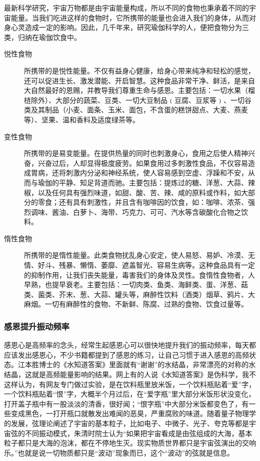 最新科学研究，宇宙万物都是由宇宙能量构成，所以不同的食物也秉承着不同的宇宙能量。当我们吃进这样的食物时，它所携带的能量也会进入我们的身体，从而对身心灵造成一定的影响。因此，几千年来，研究瑜伽科学的人，便把食物分为三类，归纳在瑜伽饮食中。

\begin{description}
    \item[悦性食物] 所携带的是悦性能量。不仅有益身心健康，给身心带来纯净和轻松的感觉，还可以促进生长、激发潜能、开启智慧。这种食品非常干净、鲜活，是来自大自然最好的恩赐，并教导我们尊重生命与感恩。主要包括：一切水果（榴梿除外）、大部分的蔬菜、豆类、一切大豆制品﹙豆腐、豆浆等﹚、一切谷类及其制品（小麦、面条、玉米、面包，不含蛋的糕饼甜点、大麦、燕麦等）、坚果、温和香料及适度绿茶等。
    \item[变性食物] 所携带的是易变能量。在提供热量的同时也刺激身心，食用之后使人精神兴奋，兴奋过后，人却显得极度疲劳。如果食用过多刺激性食品，不仅容易造成胃病，还将刺激内分泌和神经系统，使人容易感到空虚、浮躁和不安，从而与瑜伽的平静、知足背道而驰。主要包括：提炼过的糖、洋葱、大蒜、辣椒，以及任何具有强烈味道，如甜、酸、苦、辣、咸的原料或作料，如大部分的零食；还有具有刺激性，并且含有咖啡因的饮食，如：咖啡、浓茶、强烈调味、酱油、白萝卜、海带、巧克力、可可、汽水等含碳酸化合物之饮料。
    \item[惰性食物] 所携带的是惰性能量。此类食物扰乱身心安定，使人易怒、易妒、冷漠、无情、好斗、残暴、懒惰、萎靡、遮盖智光、容易生病等。这种食品具有一定的抑制作用，让我们丧失能量，毒害我们的身体及灵性。食惰性食物者，人早熟，也提早衰老。主要包括：一切肉类、鱼类、海鲜类、蛋、洋葱、菇类、菌类、芥末、葱、大蒜、罐头等，麻醉性饮料（酒类）烟草、鸦片、大麻烟。一切有麻醉性的食物、不新鲜、陈腐、过熟的食物、饮食过量等。
\end{description}

\subsubsection{感恩提升振动频率}

感恩心是高频率的念头，经常生起感恩心可以很快地提升我们的振动频率，每天都应该发出感恩心，不少书籍都提到了感恩的练习，让自己习惯于进入感恩的高频状态。江本胜博士的《水知道答案》里面就有“谢谢”的水结晶，非常漂亮的对称的水结晶，这就是高频能量影响的结果。网上有的人说《水知道答案》是伪科学，我不这样认为，有网友专门做过实验，是在饮料瓶里放米饭，一个饮料瓶贴着“爱”字，一个饮料瓶贴着“恨”字，大概半个月过后，在“爱字瓶”里大部分米饭形状没变化，打开盖子瓶中有一股淡淡的清香，很好闻；“恨字瓶”中大部分米饭都变色了，有一些变成黑色，一打开瓶口就散发出难闻的恶臭，严重腐败的味道。随着量子物理学的发展，弦理论阐述了宇宙的基本粒子，比如电子、中微子、光子、夸克等都是宇宙弦的不同振动模式，朱清时院士认为“如果把宇宙看成是由弦组成的大海，基本粒子都只是大海的泡沫，都在不停地生灭。现实物质世界都只是宇宙弦演出的交响乐。”也就是说一切物质都只是“波动”现象而已，这个“波动”的弦就是信息。

